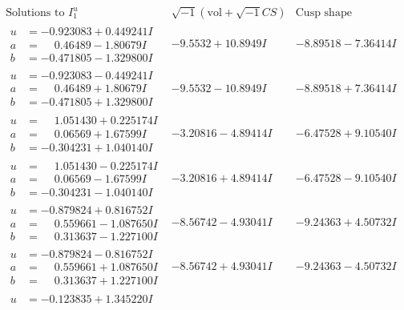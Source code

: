 \documentclass[1p]{elsarticle_modified}
\theoremstyle{definition}
\newcommand{\I}{\sqrt{-1}}
\begin{document}
$$\begin{array}{c|c|c}  
\text{Solutions to }I^u_{1}& \I (\text{vol} + \sqrt{-1}CS) & \text{Cusp shape}\\
 \hline 
\begin{aligned}
u &= -0.923083 + 0.449241 I \\
a &= \phantom{-}0.46489 - 1.80679 I \\
b &= -0.471805 - 1.329800 I\end{aligned}
 & -9.5532 + 10.8949 I & -8.89518 - 7.36414 I \\ \hline\begin{aligned}
u &= -0.923083 - 0.449241 I \\
a &= \phantom{-}0.46489 + 1.80679 I \\
b &= -0.471805 + 1.329800 I\end{aligned}
 & -9.5532 - 10.8949 I & -8.89518 + 7.36414 I \\ \hline\begin{aligned}
u &= \phantom{-}1.051430 + 0.225174 I \\
a &= \phantom{-}0.06569 + 1.67599 I \\
b &= -0.304231 + 1.040140 I\end{aligned}
 & -3.20816 - 4.89414 I & -6.47528 + 9.10540 I \\ \hline\begin{aligned}
u &= \phantom{-}1.051430 - 0.225174 I \\
a &= \phantom{-}0.06569 - 1.67599 I \\
b &= -0.304231 - 1.040140 I\end{aligned}
 & -3.20816 + 4.89414 I & -6.47528 - 9.10540 I \\ \hline\begin{aligned}
u &= -0.879824 + 0.816752 I \\
a &= \phantom{-}0.559661 - 1.087650 I \\
b &= \phantom{-}0.313637 - 1.227100 I\end{aligned}
 & -8.56742 - 4.93041 I & -9.24363 + 4.50732 I \\ \hline\begin{aligned}
u &= -0.879824 - 0.816752 I \\
a &= \phantom{-}0.559661 + 1.087650 I \\
b &= \phantom{-}0.313637 + 1.227100 I\end{aligned}
 & -8.56742 + 4.93041 I & -9.24363 - 4.50732 I \\ \hline\begin{aligned}
u &= -0.123835 + 1.345220 I \\

\end{aligned}
\end{array}$$
\end{document}
